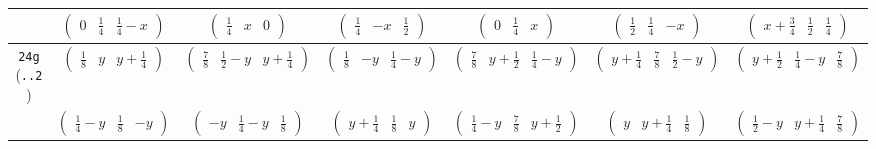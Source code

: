 \documentclass[fleqn,9pt,landscape]{jsarticle}
\begin{document}
\begin{center}
\begin{longtable}{ccccccc}
& $ \begin{pmatrix} 0 & \frac{1}{4} & \frac{1}{4} - x \end{pmatrix} $ & $ \begin{pmatrix} \frac{1}{4} & x & 0 \end{pmatrix} $ & $ \begin{pmatrix} \frac{1}{4} & - x & \frac{1}{2} \end{pmatrix} $ & $ \begin{pmatrix} 0 & \frac{1}{4} & x \end{pmatrix} $ & $ \begin{pmatrix} \frac{1}{2} & \frac{1}{4} & - x \end{pmatrix} $ & $ \begin{pmatrix} x + \frac{3}{4} & \frac{1}{2} & \frac{1}{4} \end{pmatrix} $ \\ \hline
{\tt 24g} ({\tt ..2}) & $ \begin{pmatrix} \frac{1}{8} & y & y + \frac{1}{4} \end{pmatrix} $ & $ \begin{pmatrix} \frac{7}{8} & \frac{1}{2} - y & y + \frac{1}{4} \end{pmatrix} $ & $ \begin{pmatrix} \frac{1}{8} & - y & \frac{1}{4} - y \end{pmatrix} $ & $ \begin{pmatrix} \frac{7}{8} & y + \frac{1}{2} & \frac{1}{4} - y \end{pmatrix} $ & $ \begin{pmatrix} y + \frac{1}{4} & \frac{7}{8} & \frac{1}{2} - y \end{pmatrix} $ & $ \begin{pmatrix} y + \frac{1}{2} & \frac{1}{4} - y & \frac{7}{8} \end{pmatrix} $ \\
& $ \begin{pmatrix} \frac{1}{4} - y & \frac{1}{8} & - y \end{pmatrix} $ & $ \begin{pmatrix} - y & \frac{1}{4} - y & \frac{1}{8} \end{pmatrix} $ & $ \begin{pmatrix} y + \frac{1}{4} & \frac{1}{8} & y \end{pmatrix} $ & $ \begin{pmatrix} \frac{1}{4} - y & \frac{7}{8} & y + \frac{1}{2} \end{pmatrix} $ & $ \begin{pmatrix} y & y + \frac{1}{4} & \frac{1}{8} \end{pmatrix} $ & $ \begin{pmatrix} \frac{1}{2} - y & y + \frac{1}{4} & \frac{7}{8} \end{pmatrix} $ \\ \hline

\end{longtable}
\end{center}
\end{document}
